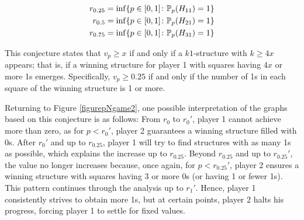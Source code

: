\begin{center}
            \,
        \end{center}

        \begin{conjecture}\label{conjecture-r-q}
                \begin{align}
                    r_{0.25} & = \inf\{p \in [0, 1] \colon \mathbb{P}_p(H_{11}) = 1\} \\
                    r_{0.5}  & = \inf\{p \in [0, 1] \colon \mathbb{P}_p(H_{21}) = 1\} \\
                    r_{0.75} & = \inf\{p \in [0, 1] \colon \mathbb{P}_p(H_{31}) = 1\}
                \end{align}  
        \end{conjecture}
        
        This conjecture states that $v_p \geq x$  if and only if a  $k1$-structure with $k \geq 4x$ appears; that is, if a winning structure for player 1 with squares having \( 4x \) or more 1s emerges. Specifically, $v_p \geq 0.25$ if and only if the number of 1s in each square of the winning structure is 1 or more. 

        Returning to Figure \ref{figurepNgame2}, one possible interpretation of the graphs based on this conjecture is as follows: From $r_0$ to $r_0'$, player 1 cannot achieve more than zero, as for $p < r_0'$, player 2 guarantees a winning structure filled with 0s. After $r_0'$ and up to $r_{0.25}$, player 1 will try to find structures with as many 1s as possible, which explains the increase up to $r_{0.25}$. Beyond $r_{0.25}$ and up to $r_{0.25}'$, the value no longer increases because, once again, for $p < r_{0.25}'$, player 2 ensures a winning structure with squares having 3 or more 0s (or having 1 or fewer 1s). This pattern continues through the analysis up to $r_1'$. Hence, player 1 consistently strives to obtain more 1s, but at certain points, player 2 halts his progress, forcing player 1 to settle for fixed values.

